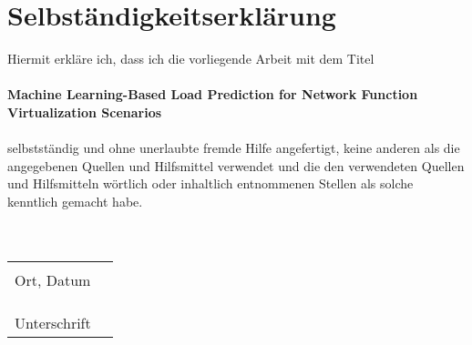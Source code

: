 	\section*{Selbständigkeitserklärung}
	Hiermit erkläre ich, dass ich die vorliegende Arbeit mit dem Titel\\
	\\
	\textbf{Machine Learning-Based Load Prediction for Network Function Virtualization Scenarios}\\
	\\
	selbstständig und ohne unerlaubte fremde Hilfe angefertigt, keine anderen als die angegebenen Quellen und Hilfsmittel verwendet und die den verwendeten Quellen und Hilfsmitteln wörtlich oder inhaltlich entnommenen Stellen als solche kenntlich gemacht habe.\\
	\\
	\\	
	
\begin{tabular}{@{}p{3.5in}p{4in}@{}}
	\hrulefill &\\
	Ort, Datum &\\
	&\\
	&\\
	\hrulefill &\\
	Unterschrift &\\
\end{tabular}